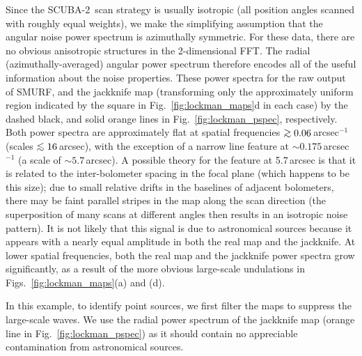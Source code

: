 \documentclass[useAMS,usenatbib,nofootinbib]{mn2e}
\newcommand{\scuba}{SCUBA-2}
\def\lsim{\mathrel{\lower2.5pt\vbox{\lineskip=0pt\baselineskip=0pt
          \hbox{$<$}\hbox{$\sim$}}}}
\def\gsim{\mathrel{\lower2.5pt\vbox{\lineskip=0pt\baselineskip=0pt
          \hbox{$>$}\hbox{$\sim$}}}}
\begin{document}
Since the \scuba\ scan strategy is usually isotropic (all position
angles scanned with roughly equal weights), we make the simplifying
assumption that the angular noise power spectrum is azimuthally
symmetric. For these data, there are no obvious anisotropic structures
in the 2-dimensional FFT. The radial (azimuthally-averaged) angular
power spectrum therefore encodes all of the useful information about
the noise properties. These power spectra for the raw output of SMURF,
and the jackknife map (transforming only the approximately uniform
region indicated by the square in Fig.~\ref{fig:lockman_maps}d in each
case) by the dashed black, and solid orange lines in
Fig.~\ref{fig:lockman_pspec}, respectively. Both power spectra are
approximately flat at spatial frequencies $\gsim 0.06$\,arcsec$^{-1}$
(scales $\lsim16$\,arcsec), with the exception of a narrow line
feature at $\sim0.175$\,arcsec$^{-1}$ (a scale of
$\sim5.7$\,arcsec). A possible theory for the feature at 5.7\,arcsec
is that it is related to the inter-bolometer spacing in the focal
plane (which happens to be this size); due to small relative drifts in
the baselines of adjacent bolometers, there may be faint parallel
stripes in the map along the scan direction (the superposition of many
scans at different angles then results in an isotropic noise
pattern). It is not likely that this signal is due to astronomical
sources because it appears with a nearly equal amplitude in both the
real map and the jackknife.  At lower spatial frequencies, both the
real map and the jackknife power spectra grow significantly, as a
result of the more obvious large-scale undulations in
Figs.~\ref{fig:lockman_maps}(a) and (d).

In this example, to identify point sources, we first filter the maps
to suppress the large-scale waves. We use the radial power spectrum of
the jackknife map (orange line in Fig.~\ref{fig:lockman_pspec}) as it
should contain no appreciable contamination from astronomical sources.
\end{document}
